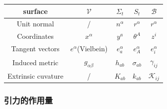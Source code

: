 \documentclass[hyperref, UTF8, a4paper]{ctexart}
\begin{document}
\begin{center}
	\begin{tabular}{ccccc}
		\hline 
		surface & $\mathscr{V}$ & $\Sigma _{t}$ & $S_{t}$ & $\mathscr{B}$ \\
		\hline 
		Unit normal & / & $n^{\alpha }$ & $r^{\alpha }$ & $r^{\alpha }$ \\
		Coordinates & $x^{\alpha }$ & $y^{a}$ & $\theta ^{A}$ & $z^{i}$ \\
		Tangent vectors & $e^{\alpha }$(Vielbein) & $e_{a}^{\alpha }$ & $e_{A}^{\alpha }$ & $e_{i}^{\alpha }$ \\
		Induced metric & $g_{\alpha \beta }$ & $h_{ab}$ & $\sigma _{ab}$ & $\gamma _{ij}$ \\
		Extrinsic cuvature & / & $K_{ab}$ & $k_{ab}$ & $\mathscr{K}_{ij}$ \\
		\hline
	\end{tabular}
\end{center}


\subsubsection{引力的作用量}
\end{document}
